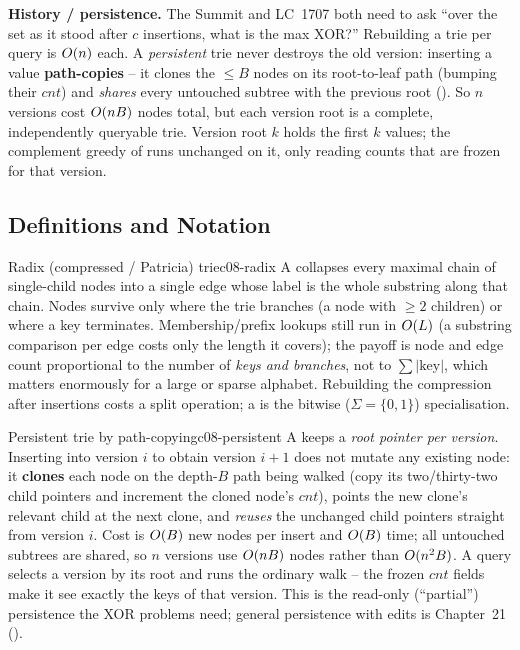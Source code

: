 \textbf{History / persistence.} The Summit and LC~1707 both need to ask ``over the set as it stood after
$c$ insertions, what is the max XOR?'' Rebuilding a trie per query is $O(n)$ each. A \emph{persistent}
trie never destroys the old version: inserting a value \textbf{path-copies} -- it clones the $\le\!B$ nodes
on its root-to-leaf path (bumping their $\mathit{cnt}$) and \emph{shares} every untouched subtree with the
previous root (). So $n$ versions cost $O(nB)$ nodes total, but each version
root is a complete, independently queryable trie. Version root $k$ holds the first $k$ values; the
complement greedy of  runs unchanged on it, only reading counts that are frozen for
that version.

\subsection{Definitions and Notation}

\begin{definition}{Radix (compressed / Patricia) trie}{c08-radix}
A  collapses every maximal chain of single-child nodes into a single edge whose label is
the whole substring along that chain. Nodes survive only where the trie branches (a node with $\ge 2$
children) or where a key terminates. Membership/prefix lookups still run in $O(L)$ (a substring
comparison per edge costs only the length it covers); the payoff is node and edge count proportional to
the number of \emph{keys and branches}, not to $\sum|{\text{key}}|$, which matters enormously for a large
or sparse alphabet. Rebuilding the compression after insertions costs a split operation; a  is the bitwise ($\Sigma=\{0,1\}$) specialisation.
\end{definition}

\begin{definition}{Persistent trie by path-copying}{c08-persistent}
A  keeps a \emph{root pointer per version}. Inserting into version $i$ to obtain
version $i{+}1$ does not mutate any existing node: it \textbf{clones} each node on the depth-$B$ path
being walked (copy its two/thirty-two child pointers and increment the cloned node's $\mathit{cnt}$),
points the new clone's relevant child at the next clone, and \emph{reuses} the unchanged child pointers
straight from version $i$. Cost is $O(B)$ new nodes per insert and $O(B)$ time; all untouched
subtrees are shared, so $n$ versions use $O(nB)$ nodes rather than $O(n^2 B)$. A query selects a
version by its root and runs the ordinary walk -- the frozen $\mathit{cnt}$ fields make it see exactly the
keys of that version. This is the read-only (``partial'') persistence the XOR problems need; general
persistence with edits is Chapter~21 ().
\end{definition}


